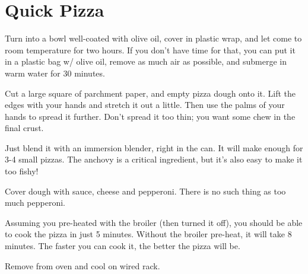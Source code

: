 \section{Quick Pizza}
\begin{recipe}



Turn into a bowl well-coated with olive oil, cover in plastic wrap, and let
come to room temperature for two hours. If you don't have time for that, you
can put it in a plastic bag w/ olive oil, remove as much air as possible, and
submerge in warm water for 30 minutes.

Cut a large square of parchment paper, and empty pizza dough onto it. Lift the
edges with your hands and stretch it out a little. Then use the palms of your
hands to spread it further. Don't spread it too thin; you want some chew in
the final crust.


Just blend it with an immersion blender, right in the can. It will make enough
for 3-4 small pizzas. The anchovy is a critical ingredient, but it's also easy
to make it too fishy!


Cover dough with sauce, cheese and pepperoni. There is no such thing as too much
pepperoni.

Assuming you pre-heated with the broiler (then turned it off), you should be able
to cook the pizza in just 5 minutes. Without the broiler pre-heat, it will take
8 minutes. The faster you can cook it, the better the pizza will be.

Remove from oven and cool on wired rack.


\end{recipe}
